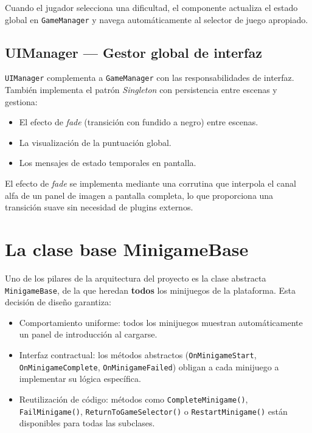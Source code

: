\documentclass[12pt, a4paper]{report}
\begin{document}
Cuando el jugador selecciona una dificultad, el componente actualiza el
estado global en \texttt{GameManager} y navega automáticamente al selector
de juego apropiado.

\subsection{UIManager — Gestor global de interfaz}

\texttt{UIManager} complementa a \texttt{GameManager} con las
responsabilidades de interfaz. También implementa el patrón \textit{Singleton}
con persistencia entre escenas y gestiona:

\begin{itemize}
  \item El efecto de \textit{fade} (transición con fundido a negro) entre
    escenas.
  \item La visualización de la puntuación global.
  \item Los mensajes de estado temporales en pantalla.
\end{itemize}

El efecto de \textit{fade} se implementa mediante una corrutina que interpola
el canal alfa de un panel de imagen a pantalla completa, lo que proporciona
una transición suave sin necesidad de plugins externos.

\section{La clase base MinigameBase}

Uno de los pilares de la arquitectura del proyecto es la clase abstracta
\texttt{MinigameBase}, de la que heredan \textbf{todos} los minijuegos de la
plataforma. Esta decisión de diseño garantiza:

\begin{itemize}
  \item Comportamiento uniforme: todos los minijuegos muestran automáticamente
    un panel de introducción al cargarse.
  \item Interfaz contractual: los métodos abstractos
    (\texttt{OnMinigameStart}, \texttt{OnMinigameComplete},
    \texttt{OnMinigameFailed}) obligan a cada minijuego a implementar su
    lógica específica.
  \item Reutilización de código: métodos como \texttt{CompleteMinigame()},
    \texttt{FailMinigame()}, \texttt{ReturnToGameSelector()} o
    \texttt{RestartMinigame()} están disponibles para todas las subclases.
\end{itemize}
\end{document}
